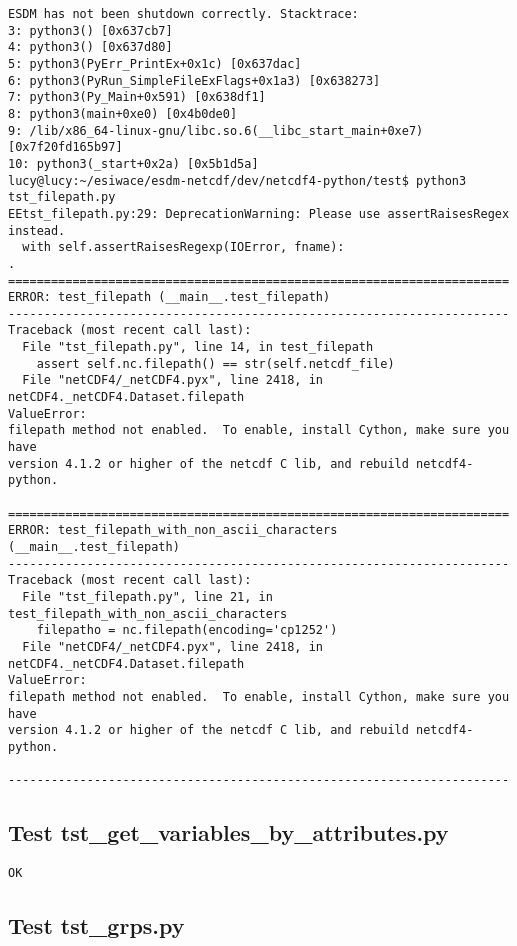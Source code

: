 \begin{verbatim}
ESDM has not been shutdown correctly. Stacktrace:
3: python3() [0x637cb7]
4: python3() [0x637d80]
5: python3(PyErr_PrintEx+0x1c) [0x637dac]
6: python3(PyRun_SimpleFileExFlags+0x1a3) [0x638273]
7: python3(Py_Main+0x591) [0x638df1]
8: python3(main+0xe0) [0x4b0de0]
9: /lib/x86_64-linux-gnu/libc.so.6(__libc_start_main+0xe7) [0x7f20fd165b97]
10: python3(_start+0x2a) [0x5b1d5a]
lucy@lucy:~/esiwace/esdm-netcdf/dev/netcdf4-python/test$ python3 tst_filepath.py
EEtst_filepath.py:29: DeprecationWarning: Please use assertRaisesRegex instead.
  with self.assertRaisesRegexp(IOError, fname):
.
======================================================================
ERROR: test_filepath (__main__.test_filepath)
----------------------------------------------------------------------
Traceback (most recent call last):
  File "tst_filepath.py", line 14, in test_filepath
    assert self.nc.filepath() == str(self.netcdf_file)
  File "netCDF4/_netCDF4.pyx", line 2418, in netCDF4._netCDF4.Dataset.filepath
ValueError:
filepath method not enabled.  To enable, install Cython, make sure you have
version 4.1.2 or higher of the netcdf C lib, and rebuild netcdf4-python.

======================================================================
ERROR: test_filepath_with_non_ascii_characters (__main__.test_filepath)
----------------------------------------------------------------------
Traceback (most recent call last):
  File "tst_filepath.py", line 21, in test_filepath_with_non_ascii_characters
    filepatho = nc.filepath(encoding='cp1252')
  File "netCDF4/_netCDF4.pyx", line 2418, in netCDF4._netCDF4.Dataset.filepath
ValueError:
filepath method not enabled.  To enable, install Cython, make sure you have
version 4.1.2 or higher of the netcdf C lib, and rebuild netcdf4-python.

----------------------------------------------------------------------
\end{verbatim}

\subsection{Test tst\_get\_variables\_by\_attributes.py}

\begin{verbatim}
OK
\end{verbatim}

\subsection{Test tst\_grps.py}

